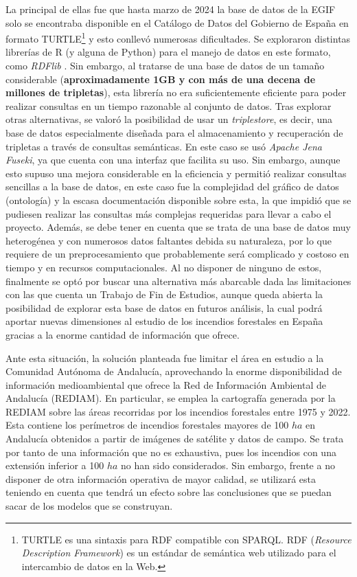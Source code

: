 \documentclass[12pt,a4paper,]{book}
\let\rmarkdownfootnote\footnote%
\def\footnote{\protect\rmarkdownfootnote}
\numberwithin{dummy}{section}
\theoremstyle{ocrenumbox}
\theoremstyle{blacknumex}
\theoremstyle{blacknumbox}
\theoremstyle{ocrenum}
\theoremstyle{ocrenum}
\begin{document}
La principal de ellas fue que hasta marzo de 2024 la base de datos de la
EGIF solo se encontraba disponible en el Catálogo de Datos del Gobierno
de España en formato TURTLE\footnote{TURTLE es una sintaxis para RDF
  compatible con SPARQL. RDF (\emph{Resource Description Framework}) es
  un estándar de semántica web utilizado para el intercambio de datos en
  la Web.} y esto conllevó numerosas dificultades. Se exploraron
distintas librerías de R (y alguna de Python) para el manejo de datos en
este formato, como \emph{RDFlib} \citep{rdflib}. Sin embargo, al
tratarse de una base de datos de un tamaño considerable
(\textbf{aproximadamente 1GB y con más de una decena de millones de
tripletas}), esta librería no era suficientemente eficiente para poder
realizar consultas en un tiempo razonable al conjunto de datos. Tras
explorar otras alternativas, se valoró la posibilidad de usar un
\emph{triplestore}, es decir, una base de datos especialmente diseñada
para el almacenamiento y recuperación de tripletas a través de consultas
semánticas. En este caso se usó \emph{Apache Jena Fuseki}, ya que cuenta
con una interfaz que facilita su uso. Sin embargo, aunque esto supuso
una mejora considerable en la eficiencia y permitió realizar consultas
sencillas a la base de datos, en este caso fue la complejidad del
gráfico de datos (ontología) y la escasa documentación disponible sobre
esta, la que impidió que se pudiesen realizar las consultas más
complejas requeridas para llevar a cabo el proyecto. Además, se debe
tener en cuenta que se trata de una base de datos muy heterogénea y con
numerosos datos faltantes debida su naturaleza, por lo que requiere de
un preprocesamiento que probablemente será complicado y costoso en
tiempo y en recursos computacionales. Al no disponer de ninguno de
estos, finalmente se optó por buscar una alternativa más abarcable dada
las limitaciones con las que cuenta un Trabajo de Fin de Estudios,
aunque queda abierta la posibilidad de explorar esta base de datos en
futuros análisis, la cual podrá aportar nuevas dimensiones al estudio de
los incendios forestales en España gracias a la enorme cantidad de
información que ofrece.

Ante esta situación, la solución planteada fue limitar el área en
estudio a la Comunidad Autónoma de Andalucía, aprovechando la enorme
disponibilidad de información medioambiental que ofrece la Red de
Información Ambiental de Andalucía (REDIAM). En particular, se emplea la
cartografía generada por la REDIAM sobre las áreas recorridas por los
incendios forestales entre 1975 y 2022. Esta contiene los perímetros de
incendios forestales mayores de 100 \(ha\) en Andalucía obtenidos a
partir de imágenes de satélite y datos de campo. Se trata por tanto de
una información que no es exhaustiva, pues los incendios con una
extensión inferior a 100 \(ha\) no han sido considerados. Sin embargo,
frente a no disponer de otra información operativa de mayor calidad, se
utilizará esta teniendo en cuenta que tendrá un efecto sobre las
conclusiones que se puedan sacar de los modelos que se construyan.
\end{document}
